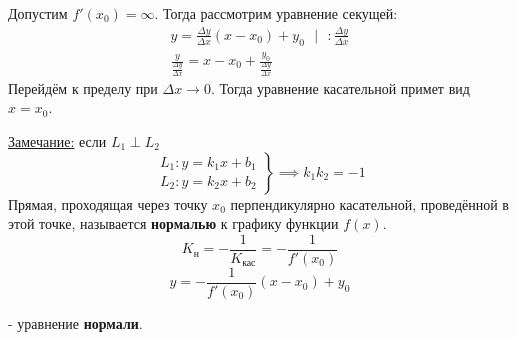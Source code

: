 \documentclass[12pt]{article}
\begin{document}
    \noindent Допустим $f'(x_0) = \infty$. Тогда рассмотрим уравнение секущей:
    \begin{gather*}
        y = \frac{\Delta y}{\Delta x} (x-x_0) + y_0 \text{ } \big| \text{ } : \frac{\Delta y}{\Delta x}\\
        \frac{y}{\frac{\Delta y}{\Delta x}} = x - x_0 + \frac{y_0}{\frac{\Delta y}{\Delta x}}
    \end{gather*}
    Перейдём к пределу при $\Delta x \to 0$. Тогда уравнение касательной примет вид \underline{$x = x_0$}.\par\noindent
    \underline{Замечание:} если $L_1 \perp L_2$
    \[ \left.\begin{matrix}
        L_1: y = k_1x + b_1\\
        L_2: y = k_2x + b_2
    \end{matrix}\right\rbrace \implies k_1k_2 = -1 \]
    Прямая, проходящая через точку $x_0$ перпендикулярно касательной, проведённой в этой точке, называется \textbf{нормалью} к графику функции $f(x)$.
    \[ K_\text{н} = -\frac{1}{K_\text{кас}} = -\frac{1}{f'(x_0)} \]
    \[ y = -\frac{1}{f'(x_0)}(x - x_0) + y_0\]
    \begin{center}
        - уравнение \textbf{нормали}.
    \end{center}
\end{document}
